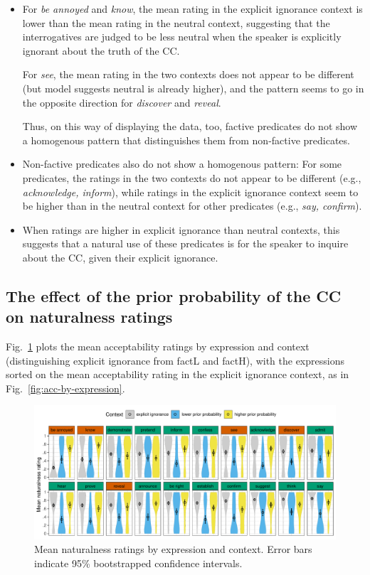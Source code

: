 \documentclass[11pt,fleqn]{article}
\newcommand{\6}{\mbox{$[\hspace*{-.6mm}[$}}
\newcommand{\9}{\mbox{$]\hspace*{-.6mm}]$}}
\begin{document}
\begin{itemize}

\item For {\em be annoyed} and {\em know}, the mean rating in the explicit ignorance context is lower than the mean rating in the neutral context, suggesting that the interrogatives are judged to be less neutral when the speaker is explicitly ignorant about the truth of the CC. 

For {\em see}, the mean rating in the two contexts does not appear to be different (but model suggests neutral is already higher), and the pattern seems to go in the opposite direction for {\em discover} and {\em reveal}. 

Thus, on this way of displaying the data, too, factive predicates do not show a homogenous pattern that distinguishes them from non-factive predicates.

\item Non-factive predicates also do not show a homogenous pattern: For some predicates, the ratings in the two contexts do not appear to be different (e.g., {\em acknowledge, inform}), while ratings in the explicit ignorance context seem to be higher than in the neutral context for other predicates (e.g., {\em say, confirm}).

\item When ratings are higher in explicit ignorance than neutral contexts, this suggests that a natural use of these predicates is for the speaker to inquire about the CC, given their explicit ignorance.

\end{itemize}

\subsection{The effect of the prior probability of the CC on naturalness ratings}

Fig.~\ref{fig:acc-by-context} plots the mean acceptability ratings by expression and context (distinguishing explicit ignorance from factL and factH), with the expressions sorted on the mean acceptability rating in the explicit ignorance context, as in Fig.~\ref{fig:acc-by-expression}.

\begin{figure}[h!]
\centering
\includegraphics[width=.8\textwidth]{../../results/main/13explicitIgnorance/graphs/naturalness-by-context-and-predicate}
\caption{Mean naturalness ratings by expression and context. Error bars indicate 95\% bootstrapped confidence intervals.}\label{fig:acc-by-context}
\end{figure}
\end{document}
